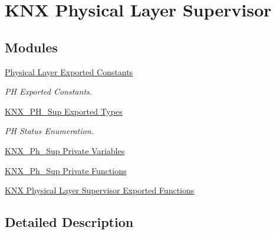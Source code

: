 \hypertarget{group___k_n_x___p_h___sup}{}\section{K\+NX Physical Layer Supervisor}
\label{group___k_n_x___p_h___sup}
\subsection*{Modules}
\begin{DoxyCompactItemize}
\item 
\hyperlink{group___p_h___exported___constants}{Physical Layer Exported Constants}
\begin{DoxyCompactList}\small\item\em PH Exported Constants. \end{DoxyCompactList}\item 
\hyperlink{group___k_n_x___p_h___sup___exported___types}{K\+N\+X\+\_\+\+P\+H\+\_\+\+Sup Exported Types}
\begin{DoxyCompactList}\small\item\em PH Status Enumeration. \end{DoxyCompactList}\item 
\hyperlink{group___k_n_x___p_h___sup___private___variables}{K\+N\+X\+\_\+\+Ph\+\_\+\+Sup Private Variables}
\item 
\hyperlink{group___k_n_x___p_h___sup___private___functions}{K\+N\+X\+\_\+\+Ph\+\_\+\+Sup Private Functions}
\item 
\hyperlink{group___k_n_x___p_h___sup___exported___functions}{K\+N\+X Physical Layer Supervisor Exported Functions}
\end{DoxyCompactItemize}


\subsection{Detailed Description}
